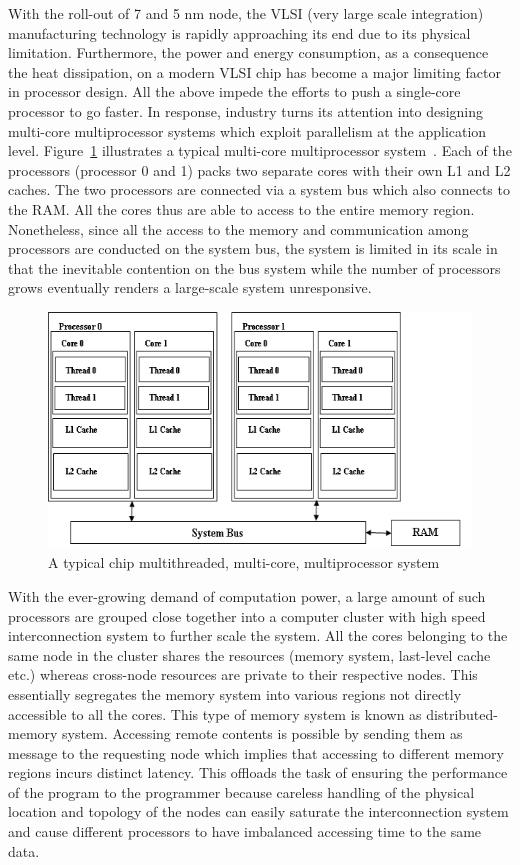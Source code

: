 With the roll-out of 7 and 5 nm node, the VLSI (very large scale integration) 
manufacturing technology is rapidly approaching its end due to its physical 
limitation. Furthermore, the power and energy consumption, as a consequence the 
heat dissipation, on a modern VLSI chip has become a major limiting factor in 
processor design. All the above impede the efforts to push a single-core 
processor to go faster. In response, industry turns its attention into designing 
multi-core multiprocessor systems which exploit parallelism at the application 
level. Figure~\ref{fig:multicore} illustrates a typical multi-core 
multiprocessor system~\cite{ibm_multicore}. Each of the processors (processor 0 
and 1) packs two separate cores with their own L1 and L2 caches. The two 
processors are connected via a system bus which also connects to the RAM. All 
the cores thus are able to access to the entire memory region. Nonetheless, 
since all the access to the memory and communication among processors are 
conducted on the system bus, the system is limited in its scale in that the 
inevitable contention on the bus system while the number of processors grows 
eventually renders a large-scale system unresponsive.
\begin{figure}[H]
    \centerline{\includegraphics[scale=0.50]{background/figs/multicore_mp_system.png}}
    \caption{A typical chip multithreaded, multi-core, multiprocessor system}
    \label{fig:multicore}
\end{figure}

With the ever-growing demand of computation power, a large amount of such 
processors are grouped close together into a computer cluster with high speed 
interconnection system to further scale the system. All the cores belonging to 
the same node in the cluster shares the resources (memory system, last-level 
cache etc.) whereas cross-node resources are private to their respective nodes.  
This essentially segregates the memory system into various regions not directly 
accessible to all the cores. This type of memory system is known as 
distributed-memory system. Accessing remote contents is possible by sending them 
as message to the requesting node which implies that accessing to different 
memory regions incurs distinct latency.  This offloads the task of ensuring the 
performance of the program to the programmer because careless handling of the 
physical location and topology of the nodes can easily saturate the 
interconnection system and cause different processors to have imbalanced 
accessing time to the same data.

